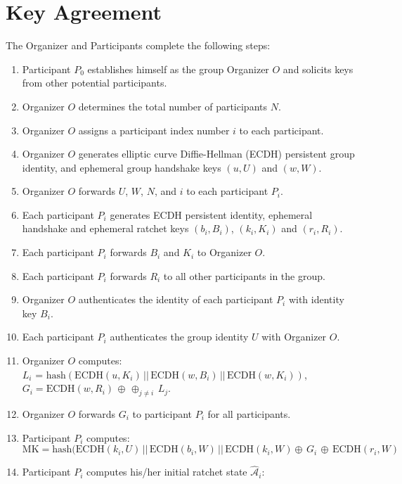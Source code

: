 \documentclass[%
preprint,
amsmath,amssymb,
aps,
prb,
floatfix,
]{revtex4-1}
\begin{document}
\section{\label{sec:keyagreement}Key Agreement}
The Organizer and Participants complete the following steps:
\begin{enumerate}
\item Participant $P_0$ establishes himself as the group Organizer $O$ and solicits
keys from other potential participants.
\item Organizer $O$ determines the total number of participants $N$.
\item Organizer $O$ assigns a participant index number $i$ to each
participant.
\item Organizer $O$ generates elliptic curve Diffie-Hellman (ECDH) persistent group
identity, and ephemeral group handshake
keys $(u, U )$ and $(w, W)$.
\item Organizer $O$ forwards $U$, $W$, $N$, and $i$ to each participant $P_i$.
\item Each participant $P_i$ generates ECDH
persistent identity, ephemeral handshake and ephemeral ratchet keys $(b_i, B_i)$,
$(k_i, K_i)$ and $(r_i, R_i)$.
\item Each participant $P_i$ forwards $B_i$ and $K_i$ to Organizer $O$.
\item Each participant $P_i$ forwards $R_i$ to all other participants in the
group.
\item Organizer $O$ authenticates the identity of each participant $P_i$ with
identity key $B_i$.
\item Each participant $P_i$ authenticates the group identity $U$ with Organizer
$O$.
\item Organizer $O$ computes:\\
$L_i$ = $\mathrm{hash}(\mathrm{ECDH}(u, K_i) \,
|| \, \mathrm{ECDH}(w, B_i) \, || \, \mathrm{ECDH}(w, K_i))$,\\
$G_i = \mathrm{ECDH} (w, R_i) \, \oplus \, \oplus_{j \ne i} \, L_j$.
\item Organizer $O$ forwards $G_i$ to participant $P_i$ for all participants.
\item Participant $P_i$ computes:\\
$\mathrm{MK} = \mathrm{hash}(\mathrm{ECDH}(k_i, U) \, ||
\, \mathrm{ECDH}(b_i, W) \, || \, \mathrm{ECDH}(k_i, W) \oplus \, G_i \, \oplus
\, \mathrm{ECDH}(r_i, W)$
\item Participant $P_i$ computes his/her initial ratchet state $\mathcal{\hat{A}}_i$:\\

\end{enumerate}
\end{document}
